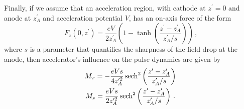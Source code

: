Finally, if we assume that an acceleration region, with cathode at $z^{\prime} = 0$ and anode at $z^{\prime}_A$ and acceleration potential $V$, has an on-axis force of the form
\begin{equation} \label{eq:anode_tanh}
  F_z(0,z^{\prime}) = \frac{eV}{2z^{\prime}_A} \left( 1 - \tanh \left( \frac{ z^{\prime} - z^{\prime}_A }{ z^{\prime}_A / s } \right) \right) \,\text{,}
\end{equation}
where $s$ is a parameter that quantifies the sharpness of the field drop at the anode, then accelerator's influence on the pulse dynamics are given by
\begin{gather}
  M_{{\scriptscriptstyle T}} = -\frac{eVs}{4z^{\prime 2}_A} \operatorname{sech}^2 \left( \frac{z^{\prime} - z^{\prime}_A }{ z^{\prime}_A / s } \right) \\
  M_z = \frac{eVs}{2z^{\prime 2}_A} \operatorname{sech}^2 \left( \frac{z^{\prime} - z^{\prime}_A }{ z^{\prime}_A / s } \right) \, \text{.}
\end{gather}
